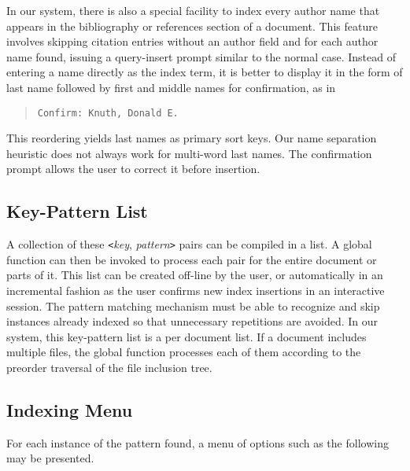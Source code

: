 In our system, there is also a special facility to index every author name
that appears in the bibliography or references section of a document.
This feature involves skipping citation entries without an author field and
for each author name found, issuing a query-insert prompt similar to
the normal case.  Instead of entering a name directly as the index term,
it is better to display it in the form of last name followed by first
and middle names for confirmation, as in
\begin{quote}
\verb|Confirm: Knuth, Donald E.|
\end{quote}
This reordering yields last names as primary sort keys.
Our name separation heuristic does not always
work for multi-word last names.  The confirmation prompt
allows the user to correct it before insertion.

\subsection{Key-Pattern List}
A collection of these \verb|<|{\it key\/}, {\it pattern\/}\verb|>| pairs
can be compiled in a list.  A global function can then be invoked to
process each pair for the entire document or parts of it.
This list can be created off-line by the user, or automatically
in an incremental fashion as the
user confirms new index insertions in an interactive session.  The pattern
matching mechanism must be able to recognize and skip instances already
indexed so that unnecessary repetitions are avoided.
In our system, this key-pattern list is a per document list.
If a document includes multiple files, the global function processes
each of them according to the preorder traversal of the file inclusion tree.


\subsection{Indexing Menu}
For each instance of the pattern found, a menu of options such as the
following may be presented.

